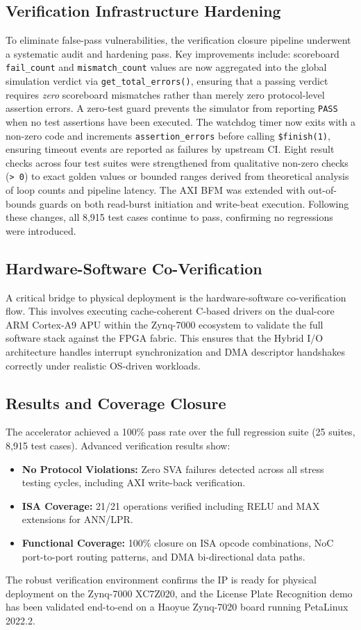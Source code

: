 \subsection{Verification Infrastructure Hardening}
To eliminate false-pass vulnerabilities, the verification closure pipeline underwent a systematic audit and hardening pass. Key improvements include: scoreboard \texttt{fail\_count} and \texttt{mismatch\_count} values are now aggregated into the global simulation verdict via \texttt{get\_total\_errors()}, ensuring that a passing verdict requires \emph{zero} scoreboard mismatches rather than merely zero protocol-level assertion errors. A zero-test guard prevents the simulator from reporting \texttt{PASS} when no test assertions have been executed. The watchdog timer now exits with a non-zero code and increments \texttt{assertion\_errors} before calling \texttt{\$finish(1)}, ensuring timeout events are reported as failures by upstream CI. Eight result checks across four test suites were strengthened from qualitative non-zero checks (\texttt{> 0}) to exact golden values or bounded ranges derived from theoretical analysis of loop counts and pipeline latency. The AXI BFM was extended with out-of-bounds guards on both read-burst initiation and write-beat execution. Following these changes, all 8,915 test cases continue to pass, confirming no regressions were introduced.

\subsection{Hardware-Software Co-Verification}
A critical bridge to physical deployment is the hardware-software co-verification flow. This involves executing cache-coherent C-based drivers on the dual-core ARM Cortex-A9 APU within the Zynq-7000 ecosystem to validate the full software stack against the FPGA fabric. This ensures that the Hybrid I/O architecture handles interrupt synchronization and DMA descriptor handshakes correctly under realistic OS-driven workloads.

\subsection{Results and Coverage Closure}
The accelerator achieved a 100\% pass rate over the full regression suite (25 suites, 8,915 test cases). Advanced verification results show:
\begin{itemize}
    \item \textbf{No Protocol Violations:} Zero SVA failures detected across all stress testing cycles, including AXI write-back verification.
    \item \textbf{ISA Coverage:} 21/21 operations verified including RELU and MAX extensions for ANN/LPR.
    \item \textbf{Functional Coverage:} 100\% closure on ISA opcode combinations, NoC port-to-port routing patterns, and DMA bi-directional data paths.
\end{itemize}
The robust verification environment confirms the IP is ready for physical deployment on the Zynq-7000 XC7Z020, and the License Plate Recognition demo has been validated end-to-end on a Haoyue Zynq-7020 board running PetaLinux 2022.2.
